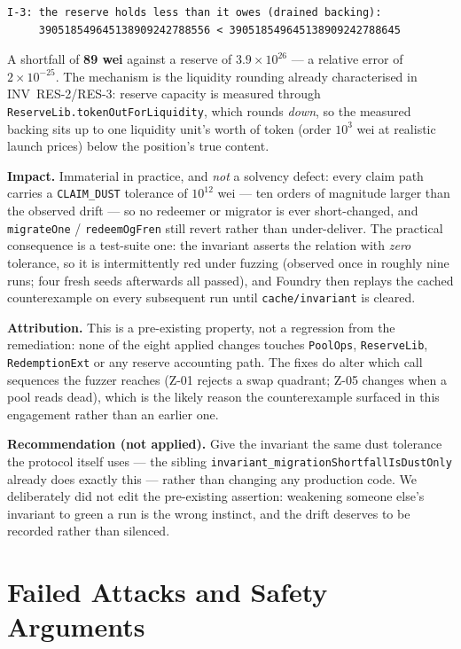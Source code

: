 \documentclass[10pt,a4paper]{article}
\newcommand{\code}[1]{\texttt{\small #1}}
\begin{document}
\begin{lstlisting}
I-3: the reserve holds less than it owes (drained backing):
     390518549645138909242788556 < 390518549645138909242788645
\end{lstlisting}

A shortfall of \textbf{89 wei} against a reserve of $3.9\times10^{26}$ --- a relative error
of $2\times10^{-25}$. The mechanism is the liquidity rounding already characterised in
INV~RES-2/RES-3: reserve capacity is measured through
\code{ReserveLib.tokenOutForLiquidity}, which rounds \emph{down}, so the measured backing
sits up to one liquidity unit's worth of token (order $10^3$ wei at realistic launch
prices) below the position's true content.

\textbf{Impact.} Immaterial in practice, and \emph{not} a solvency defect: every claim path
carries a \code{CLAIM\_DUST} tolerance of $10^{12}$ wei --- ten orders of magnitude larger
than the observed drift --- so no redeemer or migrator is ever short-changed, and
\code{migrateOne} / \code{redeemOgFren} still revert rather than under-deliver. The
practical consequence is a test-suite one: the invariant asserts the relation with
\emph{zero} tolerance, so it is intermittently red under fuzzing (observed once in roughly
nine runs; four fresh seeds afterwards all passed), and Foundry then replays the cached
counterexample on every subsequent run until \code{cache/invariant} is cleared.

\textbf{Attribution.} This is a pre-existing property, not a regression from the
remediation: none of the eight applied changes touches \code{PoolOps}, \code{ReserveLib},
\code{RedemptionExt} or any reserve accounting path. The fixes do alter which call
sequences the fuzzer reaches (Z-01 rejects a swap quadrant; Z-05 changes when a pool reads
dead), which is the likely reason the counterexample surfaced in this engagement rather
than an earlier one.

\textbf{Recommendation (not applied).} Give the invariant the same dust tolerance the
protocol itself uses --- the sibling \code{invariant\_migrationShortfallIsDustOnly} already
does exactly this --- rather than changing any production code. We deliberately did not
edit the pre-existing assertion: weakening someone else's invariant to green a run is the
wrong instinct, and the drift deserves to be recorded rather than silenced.

\section{Failed Attacks and Safety Arguments}\label{sec:failed}
\end{document}
